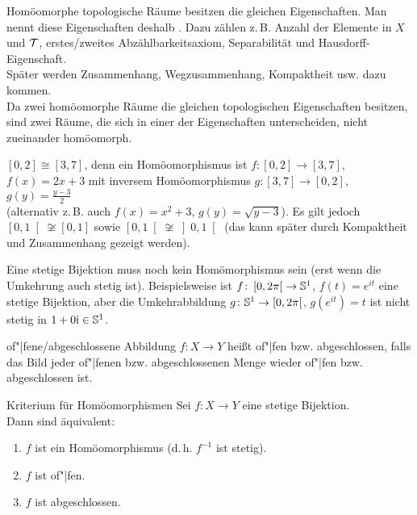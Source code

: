\begin{Bem}
    Homöomorphe topologische Räume besitzen die gleichen Eigenschaften.
    Man nennt diese Eigenschaften deshalb .
    Dazu zählen z.\,B. Anzahl der Elemente in $X$ und $\mathcal{T}$,
    erstes/zweites Abzählbarkeitsaxiom, Separabilität und
    Hausdorff-Eigenschaft. \\
    Später werden Zusammenhang, Wegzusammenhang, Kompaktheit usw.
    dazu kommen. \\
    Da zwei homöomorphe Räume die gleichen topologischen Eigenschaften
    besitzen, sind zwei Räume, die sich in einer der Eigenschaften
    unterscheiden, nicht zueinander homöomorph.
\end{Bem}

\begin{Bsp}
    $[0,2] \cong [3,7]$, denn ein Homöomorphismus ist
    $f\colon [0,2] \rightarrow [3,7]$, $f(x) = 2x + 3$ mit inversem
    Homöomorphismus $g\colon [3,7] \rightarrow [0,2]$,
    $g(y) = \frac{y - 3}{2}$ \\
    (alternativ z.\,B. auch $f(x) = x^2 + 3$, $g(y) = \sqrt{y - 3}$).
    Es gilt jedoch $\left[0,1\right[ \not\cong [0,1]$ sowie
    $\left[0,1\right[ \not\cong \left]0,1\right[$
    (das kann später durch Kompaktheit und Zusammenhang gezeigt werden).
\end{Bsp}

\begin{Bem}
    Eine stetige Bijektion muss noch kein Homömorphismus sein
    (erst wenn die Umkehrung auch stetig ist).
    Beispielsweise ist $f\colon \left[0, 2\pi\right[ \rightarrow \mathbb{S}^1$,
    $f(t) = e^{it}$ eine stetige Bijektion, aber die Umkehrabbildung
    $g\colon \mathbb{S}^1 \rightarrow \left[0, 2\pi\right[$,
    $g(e^{it}) = t$ ist nicht stetig in $1 + 0\mathrm{i} \in \mathbb{S}^1$.
\end{Bem}

\linie

\begin{Def}{of"|fene/abgeschlossene Abbildung}
    $f\colon X \rightarrow Y$ heißt of"|fen bzw. abgeschlossen, falls das
    Bild jeder of"|fenen bzw. abgeschlossenen Menge wieder of"|fen
    bzw. abgeschlossen ist.
\end{Def}

\begin{Satz}{Kriterium für Homöomorphismen}
    Sei $f\colon X \rightarrow Y$ eine stetige Bijektion. \\
    Dann sind äquivalent:
    \begin{enumerate}
        \item
        $f$ ist ein Homöomorphismus (d.\,h. $f^{-1}$ ist stetig).
        
        \item
        $f$ ist of"|fen.
        
        \item
        $f$ ist abgeschlossen.
    \end{enumerate}
\end{Satz}

